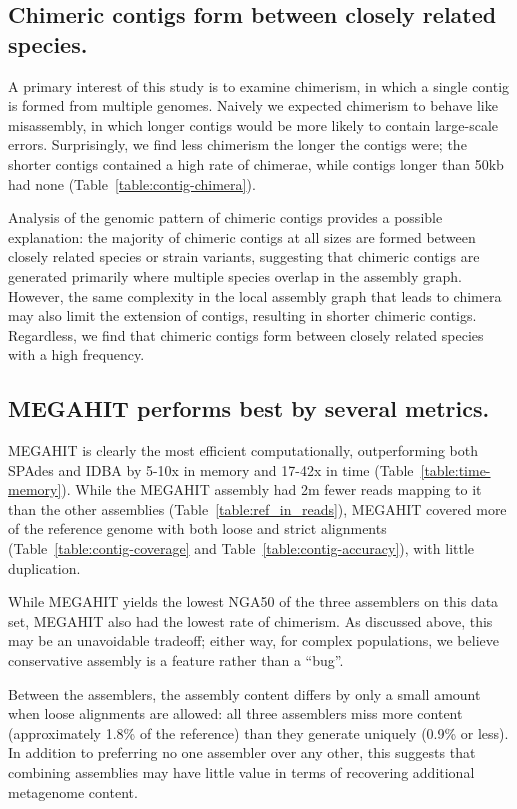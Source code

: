 \documentclass[10pt,a4paper,twocolumn]{article}
\begin{document}

\subsection*{Chimeric contigs form between closely related species.}

A primary interest of this study is to examine chimerism, in which a
single contig is formed from multiple genomes.  Naively we expected
chimerism to behave like misassembly, in which longer contigs would be
more likely to contain large-scale errors.  Surprisingly, we find
less chimerism the longer the contigs were; the shorter contigs
contained a high rate of chimerae, while contigs longer than 50kb had
none (Table~\ref{table:contig-chimera}).

Analysis of the genomic pattern of chimeric contigs provides a possible
explanation: the majority of chimeric contigs at all sizes are formed
between closely related species or strain variants, suggesting that
chimeric contigs are generated primarily where multiple species
overlap in the assembly graph.  However, the same complexity in the
local assembly graph that leads to chimera may also limit the
extension of contigs, resulting in shorter chimeric contigs.
Regardless, we find that chimeric contigs form between closely
related species with a high frequency.

\subsection*{MEGAHIT performs best by several metrics.}

MEGAHIT is clearly the most efficient computationally, outperforming
both SPAdes and IDBA by 5-10x in memory and 17-42x in time
(Table~\ref{table:time-memory}).  While the MEGAHIT assembly had 2m
fewer reads mapping to it than the other assemblies (Table~\ref{table:ref_in_reads}), MEGAHIT
covered more of the reference genome with both loose and strict
alignments (Table~\ref{table:contig-coverage} and
Table~\ref{table:contig-accuracy}), with little duplication.

While MEGAHIT yields the lowest NGA50 of the three assemblers on this
data set, MEGAHIT also had the lowest rate of chimerism.  As discussed
above, this may be an unavoidable tradeoff; either way, for complex
populations, we believe conservative assembly is a feature rather than
a ``bug''.

Between the assemblers, the assembly content differs by only a small
amount when loose alignments are allowed: all three assemblers miss
more content (approximately 1.8\% of the reference) than they generate
uniquely (0.9\% or less).  In addition to preferring no one assembler
over any other, this suggests that combining assemblies may have
little value in terms of recovering additional metagenome content.
\end{document}
